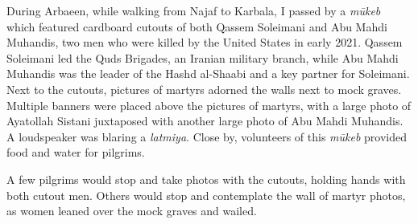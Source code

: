 



During Arbaeen, while walking from Najaf to Karbala, I passed by a \emph{mūkeb} which featured cardboard cutouts of both Qassem Soleimani and Abu Mahdi Muhandis, two men who were killed by the United States in early 2021. Qassem Soleimani led the Quds Brigades, an Iranian military branch, while Abu Mahdi Muhandis was the leader of the Hashd al-Shaabi and a key partner for Soleimani. Next to the cutouts, pictures of martyrs adorned the walls next to mock graves. Multiple banners were placed above the pictures of martyrs, with a large photo of Ayatollah Sistani juxtaposed with another large photo of Abu Mahdi Muhandis. A loudspeaker was blaring a \emph{latmiya}. Close by, volunteers of this \emph{mūkeb} provided food and water for pilgrims.

A few pilgrims would stop and take photos with the cutouts, holding hands with both cutout men. Others would stop and contemplate the wall of martyr photos, as women leaned over the mock graves and wailed.

